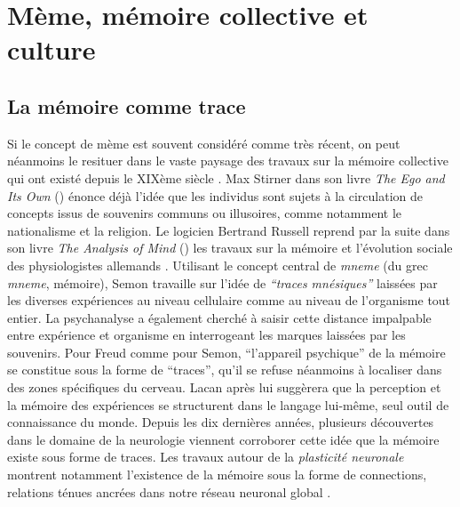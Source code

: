 \section[Mème, mémoire collective et culture]{Mème, mémoire collective et culture}
\subsection[La mémoire comme trace]{La mémoire comme trace}

Si le concept de mème est souvent considéré comme très récent, on peut néanmoins le resituer dans le vaste paysage des travaux sur la mémoire collective qui ont existé depuis le XIXème siècle \citep{Laurent1999}. Max Stirner dans son livre \textit{The Ego and Its Own} (\citeyear{Stirner1995}) énonce déjà l{\textquoteright}idée que les individus sont sujets à la circulation de concepts issus de souvenirs communs ou illusoires, comme notamment le nationalisme et la religion. Le logicien Bertrand Russell reprend par la suite dans son livre \textit{The Analysis of Mind } (\citeyear{Russell1921}) les travaux sur la mémoire et l{\textquoteright}évolution sociale des physiologistes allemands \cite{Semon1923}. Utilisant le concept central de \textit{mneme} (du grec 
\textit{mneme}, mémoire), Semon travaille sur l{\textquoteright}idée de \textit{{\textquotedblleft}traces mnésiques{\textquotedblright} }laissées par les diverses expériences au niveau cellulaire comme au niveau de l{\textquoteright}organisme tout entier. La psychanalyse a également cherché à saisir cette distance impalpable entre expérience et organisme en interrogeant les marques laissées par les souvenirs. Pour Freud comme pour Semon, {\textquotedblleft}l{\textquoteright}appareil psychique{\textquotedblright} de la mémoire se constitue sous la forme de {\textquotedblleft}traces{\textquotedblright}, qu{\textquoteright}il se refuse néanmoins à localiser dans des zones spécifiques du cerveau. Lacan après lui suggèrera que la perception et la mémoire des expériences se structurent dans le langage lui-même, seul outil de connaissance du monde. Depuis les dix dernières années, plusieurs découvertes dans le domaine de la neurologie viennent corroborer cette idée que la mémoire existe sous forme de traces. Les travaux autour de la \textit{plasticité neuronale }montrent notamment l{\textquoteright}existence de la mémoire sous la forme de connections, relations ténues ancrées dans notre réseau neuronal global \citep{Magistretti2008}.  

